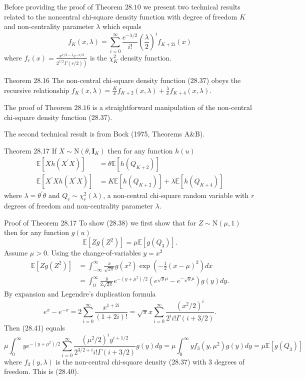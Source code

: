 \documentclass[10pt]{article}
\begin{document}
Before providing the proof of Theorem $28.10$ we present two technical results related to the noncentral chi-square density function with degree of freedom $K$ and non-centrality parameter $\lambda$ which equals
$$
f_{K}(x, \lambda)=\sum_{i=0}^{\infty} \frac{e^{-\lambda / 2}}{i !}\left(\frac{\lambda}{2}\right)^{i} f_{K+2 i}(x)
$$
where $f_{r}(x)=\frac{x^{r / 2-1} e^{-x / 2}}{\left.2^{r / 2} \Gamma(r / 2)\right)}$ is the $\chi_{K}^{2}$ density function.

Theorem 28.16 The non-central chi-square density function (28.37) obeys the recursive relationship $f_{K}(x, \lambda)=\frac{K}{x} f_{K+2}(x, \lambda)+\frac{\lambda}{x} f_{K+4}(x, \lambda)$.

The proof of Theorem $28.16$ is a straightforward manipulation of the non-central chi-square density function (28.37).

The second technical result is from Bock (1975, Theorems A\&B).

Theorem 28.17 If $X \sim \mathrm{N}\left(\theta, \boldsymbol{I}_{K}\right)$ then for any function $h(u)$
$$
\begin{aligned}
\mathbb{E}\left[X h\left(X^{\prime} X\right)\right] &=\theta \mathbb{E}\left[h\left(Q_{K+2}\right)\right] \\
\mathbb{E}\left[X^{\prime} X h\left(X^{\prime} X\right)\right] &=K \mathbb{E}\left[h\left(Q_{K+2}\right)\right]+\lambda \mathbb{E}\left[h\left(Q_{K+4}\right)\right]
\end{aligned}
$$
where $\lambda=\theta^{\prime} \theta$ and $Q_{r} \sim \chi_{r}^{2}(\lambda)$, a non-central chi-square random variable with $r$ degrees of freedom and non-centrality parameter $\lambda$.

Proof of Theorem 28.17 To show (28.38) we first show that for $Z \sim \mathrm{N}(\mu, 1)$ then for any function $g(u)$
$$
\mathbb{E}\left[Z g\left(Z^{2}\right)\right]=\mu \mathbb{E}\left[g\left(Q_{3}\right)\right] .
$$
Assume $\mu>0$. Using the change-of-variables $y=x^{2}$
$$
\begin{aligned}
\mathbb{E}\left[Z g\left(Z^{2}\right)\right] &=\int_{-\infty}^{\infty} \frac{x}{\sqrt{2 \pi}} g\left(x^{2}\right) \exp \left(-\frac{1}{2}(x-\mu)^{2}\right) d x \\
&=\int_{0}^{\infty} \frac{y}{2 \sqrt{2 \pi}} e^{-\left(y+\mu^{2}\right) / 2}\left(e^{\sqrt{y} \mu}-e^{-\sqrt{y} \mu}\right) g(y) d y .
\end{aligned}
$$
By expansion and Legendre's duplication formula
$$
e^{x}-e^{-x}=2 \sum_{i=0}^{\infty} \frac{x^{1+2 i}}{(1+2 i) !}=\sqrt{\pi} x \sum_{i=0}^{\infty} \frac{\left(x^{2} / 2\right)^{i}}{2^{i} i ! \Gamma(i+3 / 2)} .
$$
Then (28.41) equals
$$
\mu \int_{0}^{\infty} y e^{-\left(y+\mu^{2}\right) / 2} \sum_{i=0}^{\infty} \frac{\left(\mu^{2} / 2\right)^{i} y^{i+1 / 2}}{2^{3 / 2+i} i ! \Gamma(i+3 / 2)} g(y) d y=\mu \int_{0}^{\infty} y f_{3}\left(y, \mu^{2}\right) g(y) d y=\mu \mathbb{E}\left[g\left(Q_{3}\right)\right]
$$
where $f_{3}(y, \lambda)$ is the non-central chi-square density (28.37) with 3 degrees of freedom. This is (28.40).
\end{document}
